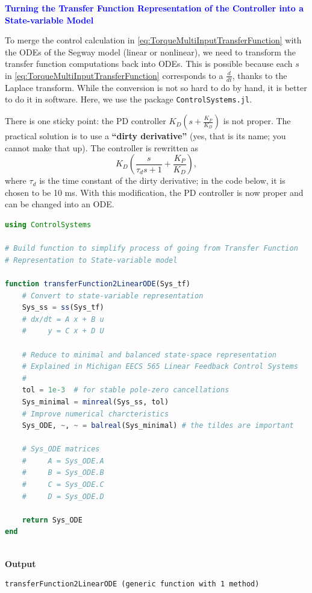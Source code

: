 \bigskip
\textcolor{blue}{\bf \large Turning the Transfer Function Representation of the Controller into a State-variable Model}
\bigskip

To merge the control calculation in \eqref{eq:TorqueMultiInputTransferFunction} with the ODEs of the Segway model (linear or nonlinear), we need to transform the transfer function computations back into ODEs. This is possible because each $s$ in \eqref{eq:TorqueMultiInputTransferFunction} corresponds to a $\frac{d}{dt}$, thanks to the Laplace transform. While the conversion is not so hard to do by hand, it is better to do it in software. Here, we use the package \texttt{ControlSystems.jl}. 

There is one sticky point: the PD controller $K_D \left( s + \frac{K_P}{K_D} \right)$ is not proper. The practical solution is to use a \textbf{``dirty derivative''} (yes, that is its name; you cannot make that up). The controller is rewritten as 
$$K_D \left( \frac{s}{\tau_d s + 1} + \frac{K_P}{K_D} \right), $$
where $\tau_d$ is the time constant of the dirty derivative; in the code below, it is chosen to be 10 ms. With this modification, the PD controller is now proper and can be changed into an ODE.

\begin{lstlisting}[language=Julia,style=mystyle]
using ControlSystems

# Build function to simplify process of going from Transfer Function 
# Representation to State-variable model

function transferFunction2LinearODE(Sys_tf)
    # Convert to state-variable representation
    Sys_ss = ss(Sys_tf)
    # dx/dt = A x + B u
    #     y = C x + D U

    # Reduce to minimal and balanced state-space representation
    # Explained in Michigan EECS 565 Linear Feedback Control Systems 
    #
    tol = 1e-3  # for stable pole-zero cancellations
    Sys_minimal = minreal(Sys_ss, tol)
    # Improve numerical charcteristics 
    Sys_ODE, ~, ~ = balreal(Sys_minimal) # the tildes are important
    
    # Sys_ODE matrices
    #     A = Sys_ODE.A
    #     B = Sys_ODE.B
    #     C = Sys_ODE.C
    #     D = Sys_ODE.D

    return Sys_ODE
end
    
\end{lstlisting}
\textbf{Output} 
\begin{verbatim}
transferFunction2LinearODE (generic function with 1 method)
\end{verbatim}

